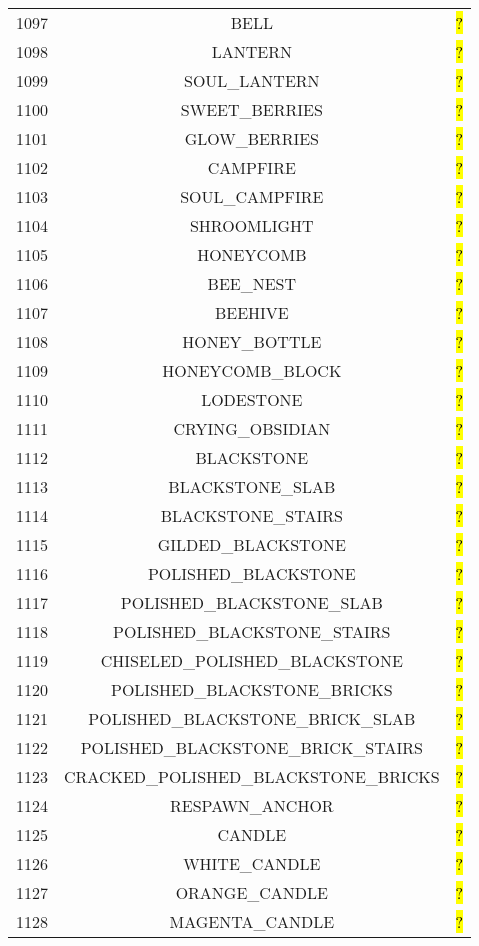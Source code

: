 \documentclass[11pt]{article}
\newcommand\myworries[1]{\sethlcolor{red}\hl{#1}}
\begin{document}
\begin{longtable}{ |c|c|c| }
1097 & BELL & \myworries{?} \\
1098 & LANTERN & \myworries{?} \\
1099 & SOUL\_LANTERN & \myworries{?} \\
1100 & SWEET\_BERRIES & \myworries{?} \\
1101 & GLOW\_BERRIES & \myworries{?} \\
1102 & CAMPFIRE & \myworries{?} \\
1103 & SOUL\_CAMPFIRE & \myworries{?} \\
1104 & SHROOMLIGHT & \myworries{?} \\
1105 & HONEYCOMB & \myworries{?} \\
1106 & BEE\_NEST & \myworries{?} \\
1107 & BEEHIVE & \myworries{?} \\
1108 & HONEY\_BOTTLE & \myworries{?} \\
1109 & HONEYCOMB\_BLOCK & \myworries{?} \\
1110 & LODESTONE & \myworries{?} \\
1111 & CRYING\_OBSIDIAN & \myworries{?} \\
1112 & BLACKSTONE & \myworries{?} \\
1113 & BLACKSTONE\_SLAB & \myworries{?} \\
1114 & BLACKSTONE\_STAIRS & \myworries{?} \\
1115 & GILDED\_BLACKSTONE & \myworries{?} \\
1116 & POLISHED\_BLACKSTONE & \myworries{?} \\
1117 & POLISHED\_BLACKSTONE\_SLAB & \myworries{?} \\
1118 & POLISHED\_BLACKSTONE\_STAIRS & \myworries{?} \\
1119 & CHISELED\_POLISHED\_BLACKSTONE & \myworries{?} \\
1120 & POLISHED\_BLACKSTONE\_BRICKS & \myworries{?} \\
1121 & POLISHED\_BLACKSTONE\_BRICK\_SLAB & \myworries{?} \\
1122 & POLISHED\_BLACKSTONE\_BRICK\_STAIRS & \myworries{?} \\
1123 & CRACKED\_POLISHED\_BLACKSTONE\_BRICKS & \myworries{?} \\
1124 & RESPAWN\_ANCHOR & \myworries{?} \\
1125 & CANDLE & \myworries{?} \\
1126 & WHITE\_CANDLE & \myworries{?} \\
1127 & ORANGE\_CANDLE & \myworries{?} \\
1128 & MAGENTA\_CANDLE & \myworries{?} \\

\end{longtable}
\end{document}
